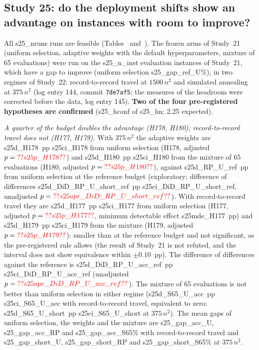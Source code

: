 \subsection{Study 25: do the deployment shifts show an advantage on instances with room to improve?}\label{sec:s25}
All \num{s25_nruns} runs are feasible (Tables~ and~). The frozen arms of Study~21 (uniform selection, adaptive weights with the default hyperparameters, mixture of 65 evaluations) were run on the \num{s25_n_inst} evaluation instances of Study~21, which have a gap to improve (uniform selection \num{s25_gap_ref_U}\%), in two regimes of Study~22: record-to-record travel at $1500\,n^2$ and simulated annealing at $375\,n^2$ (log entry 144, commit \texttt{7de7af5}; the measures of the headroom were corrected before the data, log entry 145). \textbf{Two of the four pre-registered hypotheses are confirmed} (\num{s25_hconf} of \num{s25_hn}; 2.25 expected).

\emph{A quarter of the budget doubles the advantage (H178, H180); record-to-record travel does not (H177, H179).} With $375\,n^2$ the adaptive weights are \num{s25d_H178}~pp \num{s25ci_H178} from uniform selection (H178, adjusted $p=\num{s25p_H178}$) and \num{s25d_H180}~pp \num{s25ci_H180} from the mixture of 65 evaluations (H180, adjusted $p=\num{s25p_H180}$), against \num{s25d_RP_U_ref}~pp from uniform selection at the reference budget (exploratory; difference of differences \num{s25d_DiD_RP_U_short_ref}~pp \num{s25ci_DiD_RP_U_short_ref}, unadjusted $p=\num{s25apr_DiD_RP_U_short_ref}$). With record-to-record travel they are \num{s25d_H177}~pp \num{s25ci_H177} from uniform selection (H177, adjusted $p=\num{s25p_H177}$, minimum detectable effect \num{s25mde_H177}~pp) and \num{s25d_H179}~pp \num{s25ci_H179} from the mixture (H179, adjusted $p=\num{s25p_H179}$): smaller than at the reference budget and not significant, as the pre-registered rule allows (the result of Study~21 is not refuted, and the interval does not show equivalence within $\pm0.10$~pp). The difference of differences against the reference is \num{s25d_DiD_RP_U_acc_ref}~pp \num{s25ci_DiD_RP_U_acc_ref} (unadjusted $p=\num{s25apr_DiD_RP_U_acc_ref}$). The mixture of 65 evaluations is not better than uniform selection in either regime (\num{s25d_S65_U_acc}~pp \num{s25ci_S65_U_acc} with record-to-record travel, equivalent to zero; \num{s25d_S65_U_short}~pp \num{s25ci_S65_U_short} at $375\,n^2$). The mean gaps of uniform selection, the weights and the mixture are \num{s25_gap_acc_U}, \num{s25_gap_acc_RP} and \num{s25_gap_acc_S65}\% with record-to-record travel and \num{s25_gap_short_U}, \num{s25_gap_short_RP} and \num{s25_gap_short_S65}\% at $375\,n^2$.

